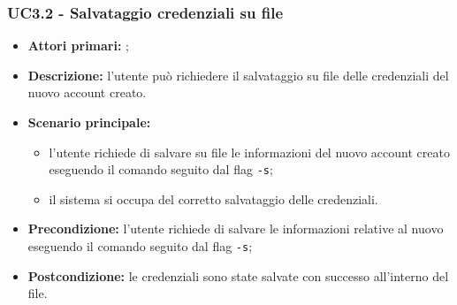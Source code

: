 \subsubsection{UC3.2 - Salvataggio credenziali su file}
\begin{itemize}
	\item \textbf{Attori primari:} \una{};
	\item \textbf{Descrizione:} l’utente può richiedere il salvataggio su file delle credenziali del nuovo account creato.
	\item \textbf{Scenario principale:}
	\begin{itemize}
		\item l’utente richiede di salvare su file le informazioni del nuovo account creato eseguendo il comando \signup{} seguito dal flag \texttt{-s}; 
		\item il sistema si occupa del corretto salvataggio delle credenziali. 
	\end{itemize}
	\item \textbf{Precondizione:} l’utente richiede di salvare le informazioni relative al nuovo eseguendo il comando \signup{} seguito dal flag \texttt{-s};  
	\item \textbf{Postcondizione:} le credenziali sono state salvate con successo all’interno del file.
\end{itemize}